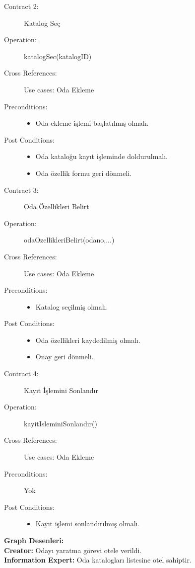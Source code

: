\documentclass[12pt,a4paper]{report}
\begin{document}
\begin{description}
\item[Contract 2:] Katalog Seç
\item[Operation:] katalogSec(katalogID)
\item[Cross References:] Use cases: Oda Ekleme
\item[Preconditions:] \hspace{10 mm}
\begin{itemize}
\item Oda ekleme işlemi başlatılmış olmalı.
\end{itemize}
\item[Post Conditions:] \hspace{10 mm}
\begin{itemize} 
\item Oda kataloğu kayıt işleminde doldurulmalı.
\item Oda özellik formu geri dönmeli. \\
\end{itemize}
\end{description}

\begin{description}
\item[Contract 3:] Oda Özellikleri Belirt
\item[Operation:] odaOzellikleriBelirt(odano,...)
\item[Cross References:] Use cases: Oda Ekleme
\item[Preconditions:] \hspace{10 mm}
\begin{itemize}
\item Katalog seçilmiş olmalı.
\end{itemize}
\item[Post Conditions:] \hspace{10 mm}
\begin{itemize} 
\item Oda özellikleri kaydedilmiş olmalı.
\item Onay geri dönmeli. \\
\end{itemize}
\end{description}

\begin{description}
\item[Contract 4:] Kayıt İşlemini Sonlandır
\item[Operation:] kayitIsleminiSonlandır()
\item[Cross References:] Use cases: Oda Ekleme
\item[Preconditions:] Yok
\item[Post Conditions:] \hspace{10 mm}
\begin{itemize} 
\item Kayıt işlemi sonlandırılmış olmalı. \\
\end{itemize}
\end{description}
\newpage
{\bf Graph Desenleri:}\\
{\bf Creator:} Odayı yaratma görevi otele verildi.\\
{\bf Information Expert:} Oda katalogları listesine otel sahiptir. \\
\end{document}
